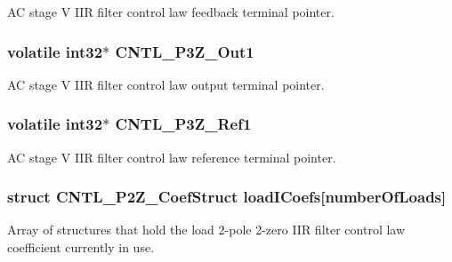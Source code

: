 A\-C stage V I\-I\-R filter control law feedback terminal pointer. \hypertarget{a00014_acb0edbb1cfd2fb0e63ac2eb233dcd577}{
\subsubsection[{C\-N\-T\-L\-\_\-3\-P3\-Z\-\_\-\-Out1}]{\setlength{\rightskip}{0pt plus 5cm}volatile int32$\ast$ C\-N\-T\-L\-\_\-P3\-Z\-\_\-\-Out1}}\label{a00014_acb0edbb1cfd2fb0e63ac2eb233dcd577}
A\-C stage V I\-I\-R filter control law output terminal pointer. \hypertarget{a00014_a6ebe91dab023eff56cade0eddcd3e96d}{
\subsubsection[{C\-N\-T\-L\-\_\-3\-P3\-Z\-\_\-\-Ref1}]{\setlength{\rightskip}{0pt plus 5cm}volatile int32$\ast$ C\-N\-T\-L\-\_\-P3\-Z\-\_\-\-Ref1}}\label{a00014_a6ebe91dab023eff56cade0eddcd3e96d}
A\-C stage V I\-I\-R filter control law reference terminal pointer. \hypertarget{a00014_af15987bb0b6b0819b233fa6963671a35}{
\subsubsection[{load\-I\-Coefs}]{\setlength{\rightskip}{0pt plus 5cm}struct C\-N\-T\-L\-\_\-P2\-Z\-\_\-\-Coef\-Struct load\-I\-Coefs\mbox{[}number\-Of\-Loads\mbox{]}}}\label{a00014_af15987bb0b6b0819b233fa6963671a35}
Array of structures that hold the load 2-\/pole 2-\/zero I\-I\-R filter control law coefficient currently in use. 